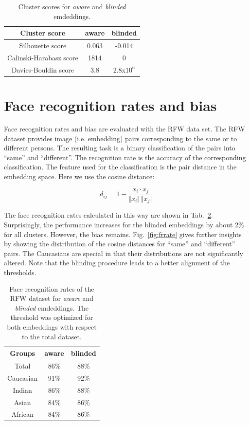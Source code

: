 \documentclass[12pt]{article}
\begin{document}
\begin{table}
\begin{center}
\begin{tabular}{ c|c|c }
Cluster score & aware  & blinded  \\
\hline
Silhouette score & 0.063 & -0.014 \\ 
Calinski-Harabasz score & 1814 & 0 \\  
Davies-Bouldin score & 3.8 & 2.8x$10^6$  
\end{tabular}
\end{center}
\caption{Cluster scores for  \emph{aware}  and  \emph{blinded} emdeddings.}
\label{tab:cluster}
\end{table}

\section{Face recognition rates and bias}

Face recognition rates and bias are evaluated with the RFW data set. The RFW dataset provides image (i.e. embedding) pairs corresponding to the same or to different persons. The resulting task is a binary classification of the pairs into ``same'' and ``different''. The recognition rate is the accuracy of the corresponding classification. The feature used for the classification is the pair distance in the embedding space. Here we use the cosine distance:

\begin{equation}
\label{eq:cos}
	d_{ij} = 1 - \frac{x_i\cdot x_j}{\Vert x_i \Vert\,\Vert x_j \Vert }
\end{equation} 

\noindent The face recognition rates calculated in this way are shown in  Tab.~\ref{tab:frrate}. Surprisingly, the performance increases for the blinded embeddings by about 2\% for all clusters. However, the bias remains.  Fig.~\ref{fig:frrate} gives further insights by showing the distribution of the cosine distances for ``same'' and ``different'' pairs. The Caucasians are special in that their distributions are not significantly altered. Note that the blinding procedure leads to a better alignment of the thresholds. 


\begin{table}
\begin{center}
\begin{tabular}{ c|c|c }
Groups & aware  & blinded  \\
\hline
Total & 86\% & 88\% \\ 
Caucasian & 91\% & 92\% \\  
Indian & 86\% & 88\% \\ 
Asian & 84\% & 86\% \\ 
African & 84\% & 86\% 
\end{tabular}
\end{center}
\caption{Face recognition rates of the RFW dataset for \emph{aware}  and  \emph{blinded} emdeddings. The threshold was optimized for both embeddings with respect to the total dataset.}
\label{tab:frrate}
\end{table}
\end{document}
